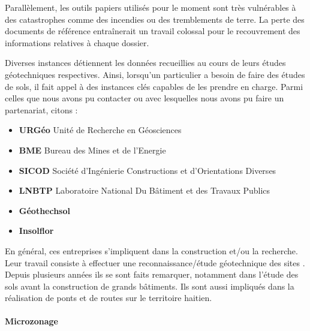 \par
Parallèlement, les outils papiers utilisés pour le moment sont très vulnérables à des
catastrophes comme des incendies ou des tremblements de terre. La perte 
des documents de référence entraînerait un travail
colossal pour le recouvrement des informations relatives à chaque 
dossier.
\par
Diverses instances détiennent les données recueillies au cours
de leurs études géotechniques respectives. 
Ainsi, lorsqu’un particulier a besoin de faire des études de sols, il 
fait appel à des instances clés capables de les prendre en charge. 
Parmi celles que nous avons pu contacter ou avec lesquelles nous avons pu faire un partenariat, 
citons :
\begin{itemize}
    \item \textbf{URGéo}
    Unité de Recherche en Géosciences \cite{linkurgeo} 
    \item \textbf{BME}
    Bureau des Mines et de l’Energie \cite{linkbme} 
    \item \textbf{SICOD}
    Société d’Ingénierie Constructions et d’Orientations Diverses
    \item \textbf{LNBTP}
    Laboratoire National Du Bâtiment et des Travaux Publics \cite{linklnbtp} 
    \item \textbf{Géothechsol} \cite{linkgeotechsol} 
    \item \textbf{Insolflor} 
\end{itemize}   
  
\par
En général, ces entreprises s'impliquent dans la construction et/ou la recherche. 
Leur travail consiste à effectuer une reconnaissance/étude géotechnique des sites .
Depuis plusieurs années ils se sont faits remarquer, notamment dans
l'étude des sols avant la construction de grands bâtiments. Ils sont aussi impliqués
dans la réalisation de ponts et de routes sur le territoire
haitien.
\paragraph{Microzonage}
